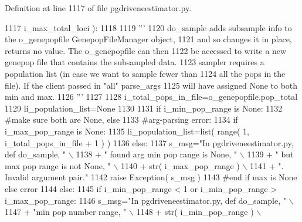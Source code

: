 Definition at line 1117 of file pgdriveneestimator.\+py.


\begin{DoxyCode}
1117                 i\_max\_total\_loci ):
1118 
1119     \textcolor{stringliteral}{'''}
1120 \textcolor{stringliteral}{    do\_sample adds subsample info to the o\_genepopfile GenepopFileManager object,}
1121 \textcolor{stringliteral}{    and so changes it in place, returns no value.  The o\_genepopfile can then}
1122 \textcolor{stringliteral}{    be accessed to write a new genepop file that contains the subsampled data.}
1123 \textcolor{stringliteral}{    sampler requires a population list (in case we want to sample fewer than}
1124 \textcolor{stringliteral}{    all the pops in the file). If the client passed in "all" parse\_args}
1125 \textcolor{stringliteral}{    will have assigned None to both min and max.}
1126 \textcolor{stringliteral}{    '''}
1127 
1128     i\_total\_pops\_in\_file=o\_genepopfile.pop\_total
1129     li\_population\_list=\textcolor{keywordtype}{None}
1130 
1131     \textcolor{keywordflow}{if} i\_min\_pop\_range \textcolor{keywordflow}{is} \textcolor{keywordtype}{None}:
1132         \textcolor{comment}{#make sure both are None, else}
1133         \textcolor{comment}{#arg-parsing error:}
1134         \textcolor{keywordflow}{if} i\_max\_pop\_range \textcolor{keywordflow}{is} \textcolor{keywordtype}{None}:
1135             li\_population\_list=list( range( 1, i\_total\_pops\_in\_file + 1 ) )
1136         \textcolor{keywordflow}{else}:
1137             s\_msg=\textcolor{stringliteral}{"In pgdriveneestimator.py, def do\_sample, "} \(\backslash\)
1138                         + \textcolor{stringliteral}{" found arg min pop range is None, "} \(\backslash\)
1139                         + \textcolor{stringliteral}{" but max pop range is not None, "} \(\backslash\)
1140                         + str( i\_max\_pop\_range ) \(\backslash\)
1141                         + \textcolor{stringliteral}{".  Invalid argument pair."}
1142             \textcolor{keywordflow}{raise} Exception( s\_msg )
1143         \textcolor{comment}{#end if max is None else error}
1144     \textcolor{keywordflow}{else}:
1145         \textcolor{keywordflow}{if} i\_min\_pop\_range < 1 \textcolor{keywordflow}{or} i\_min\_pop\_range > i\_max\_pop\_range:
1146             s\_msg=\textcolor{stringliteral}{"In pgdriveneestimator.py, def do\_sample, "} \(\backslash\)
1147                         + \textcolor{stringliteral}{"min pop number range, "} \(\backslash\)
1148                         + str( i\_min\_pop\_range ) \(\backslash\)

\end{DoxyCode}
